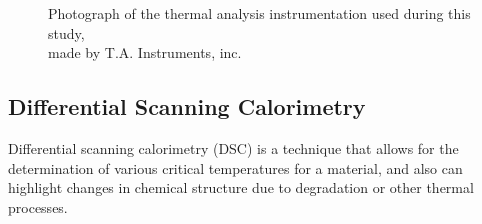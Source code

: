 \begin{figure}[tb]
   \centering
   \caption[T.A. Instruments, inc. Instrumentation]%
   		{Photograph of the thermal analysis instrumentation used during this study, \\
		made by T.A.  Instruments, inc.}
   \label{fig:TA-Instruments}
\end{figure}


\subsection{Differential Scanning Calorimetry}
	
Differential scanning calorimetry (DSC) is a technique that allows for the determination of various critical temperatures for a material, and also can highlight changes in chemical structure due to degradation or other thermal processes. 

